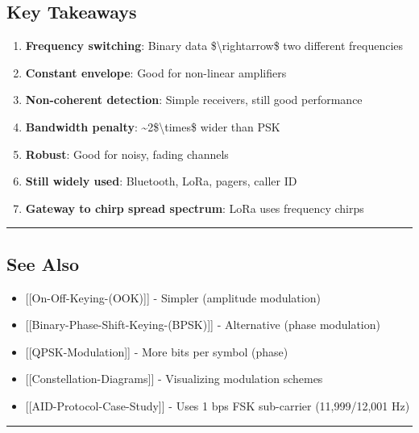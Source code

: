 \subsection{\texorpdfstring{ Key
Takeaways}{ Key Takeaways}}\label{key-takeaways}

\begin{enumerate}
\def\labelenumi{\arabic{enumi}.}
\tightlist
\item
  \textbf{Frequency switching}: Binary data
  \$\textbackslash rightarrow\$ two different frequencies
\item
  \textbf{Constant envelope}: Good for non-linear amplifiers
\item
  \textbf{Non-coherent detection}: Simple receivers, still good
  performance
\item
  \textbf{Bandwidth penalty}: \textasciitilde2\$\textbackslash times\$
  wider than PSK
\item
  \textbf{Robust}: Good for noisy, fading channels
\item
  \textbf{Still widely used}: Bluetooth, LoRa, pagers, caller ID
\item
  \textbf{Gateway to chirp spread spectrum}: LoRa uses frequency chirps
\end{enumerate}

\begin{center}\rule{0.5\linewidth}{0.5pt}\end{center}

\subsection{\texorpdfstring{ See Also}{ See Also}}\label{see-also}

\begin{itemize}
\tightlist
\item
  {[}{[}On-Off-Keying-(OOK){]}{]} - Simpler (amplitude modulation)
\item
  {[}{[}Binary-Phase-Shift-Keying-(BPSK){]}{]} - Alternative (phase
  modulation)
\item
  {[}{[}QPSK-Modulation{]}{]} - More bits per symbol (phase)
\item
  {[}{[}Constellation-Diagrams{]}{]} - Visualizing modulation schemes
\item
  {[}{[}AID-Protocol-Case-Study{]}{]} - Uses 1 bps FSK sub-carrier
  (11,999/12,001 Hz)
\end{itemize}

\begin{center}\rule{0.5\linewidth}{0.5pt}\end{center}

